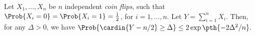 \begin{corollary}
    Let $X_1, \ldots, X_n$ be $n$ independent \emph{coin flips}, such
    that $\Prob{X_i =0} =\Prob{X_i=1} = \frac{1}{2}$, for $i=1,\ldots,
    n$. Let $Y = \sum_{i=1}^n X_i$. Then, for any $\Delta >0$, we have
    \begin{math}
        \Prob{\cardin{Y - {n}/{2}} \geq \Delta }%
        \leq%
        2\exp \pth{-2\Delta^2/n}.
  \end{math}
\end{corollary}
